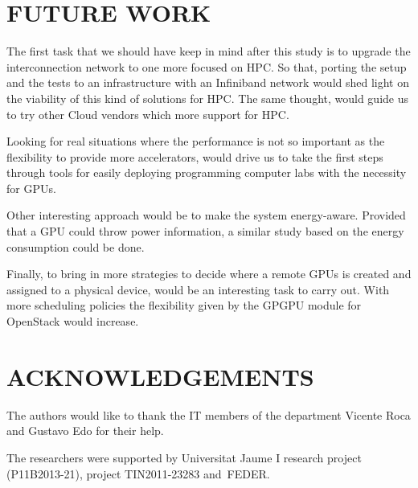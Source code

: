 \documentclass[a4paper,twoside]{article}
\begin{document}
\section{\uppercase{Future work}}
\label{sec:future}
The first task that we should have keep in mind after this study is to upgrade the interconnection network to one more focused on HPC.
So that, porting the setup and the tests to an infrastructure with an Infiniband network would shed light on the viability of this kind of solutions for HPC.
The same thought, would guide us to try other Cloud vendors which more support for HPC.

Looking for real situations where the performance is not so important as the flexibility to provide more accelerators, 
would drive us to take the first steps through tools for easily deploying programming computer labs with the necessity for GPUs.

Other interesting approach would be to make the system energy-aware. 
Provided that a GPU could throw power information, a similar study based on the energy consumption could be done.

Finally, to bring in more strategies to decide where a remote GPUs is created and assigned to a physical device, would be an interesting task to carry out. 
With more scheduling policies the flexibility given by the GPGPU module for OpenStack would increase.

\section*{\uppercase{Acknowledgements}}
The authors would like to thank the IT members of the department Vicente Roca and Gustavo Edo for their help.

The researchers were supported by Universitat Jaume I research project (P11B2013-21), project
TIN2011-23283 and~FEDER.


{\small
}
\end{document}
